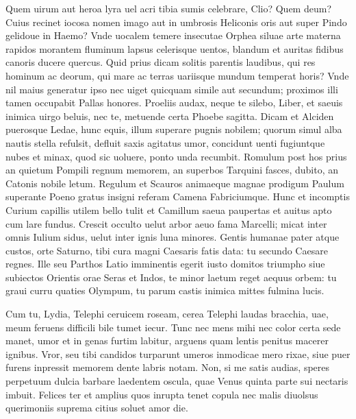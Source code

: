 \documentclass{book}
\newenvironment {carmen} [1] [\relax] 
  {\Titulus \Versus \incipit*\numerus{1}#1}
  {\endVersus}
\newcommand {\Sapphic}   {\Forma \strophae {0 \poena 00 \poena 1}}
\newcommand {\GlycAscl}  {\Forma \strophae {2 \poena 0}}
\begin{document}
\begin{carmen}[\Sapphic]

 Quem uirum aut heroa lyra uel acri
 tibia sumis celebrare, Clio?
 Quem deum? Cuius recinet iocosa
      nomen imago
 aut in umbrosis Heliconis oris               
 aut super Pindo gelidoue in Haemo?
 Vnde uocalem temere insecutae
      Orphea siluae
 arte materna rapidos morantem
 fluminum lapsus celerisque uentos,               
 blandum et auritas fidibus canoris
      ducere quercus.
 Quid prius dicam solitis parentis
 laudibus, qui res hominum ac deorum,
 qui mare ac terras uariisque mundum               
      temperat horis?
 Vnde nil maius generatur ipso
 nec uiget quicquam simile aut secundum;
 proximos illi tamen occupabit
       Pallas honores.               
 Proeliis audax, neque te silebo,
 Liber, et saeuis inimica uirgo
 beluis, nec te, metuende certa
      Phoebe sagitta.
 Dicam et Alciden puerosque Ledae,               
 hunc equis, illum superare pugnis
 nobilem; quorum simul alba nautis
      stella refulsit,
 defluit saxis agitatus umor,
 concidunt uenti fugiuntque nubes               
 et minax, quod sic uoluere, ponto
      unda recumbit.
 Romulum post hos prius an quietum
 Pompili regnum memorem, an superbos
 Tarquini fasces, dubito, an Catonis               
      nobile letum.
 Regulum et Scauros animaeque magnae
 prodigum Paulum superante Poeno
 gratus insigni referam Camena
       Fabriciumque.               
 Hunc et incomptis Curium capillis
 utilem bello tulit et Camillum
 saeua paupertas et auitus apto
      cum lare fundus.
 Crescit occulto uelut arbor aeuo               
 fama Marcelli; micat inter omnis
 Iulium sidus, uelut inter ignis
      luna minores.
 Gentis humanae pater atque custos,
 orte Saturno, tibi cura magni               
 Caesaris fatis data: tu secundo
      Caesare regnes.
 Ille seu Parthos Latio imminentis
 egerit iusto domitos triumpho
 siue subiectos Orientis orae               
      Seras et Indos,
 te minor laetum reget aequus orbem:
 tu graui curru quaties Olympum,
 tu parum castis inimica mittes
       fulmina lucis.                

\end{carmen}

\begin{carmen}[\GlycAscl]


      Cum tu, Lydia, Telephi
 ceruicem roseam, cerea Telephi
      laudas bracchia, uae, meum
 feruens difficili bile tumet iecur.
       Tunc nec mens mihi nec color
 certa sede manet, umor et in genas               
      furtim labitur, arguens
 quam lentis penitus macerer ignibus.
      Vror, seu tibi candidos
 turparunt umeros inmodicae mero               
      rixae, siue puer furens
 inpressit memorem dente labris notam.
      Non, si me satis audias,
 speres perpetuum dulcia barbare
       laedentem oscula, quae Venus               
 quinta parte sui nectaris imbuit.
      Felices ter et amplius
 quos inrupta tenet copula nec malis
      diuolsus querimoniis
 suprema citius soluet amor die.                

\end{carmen}
\end{document}
